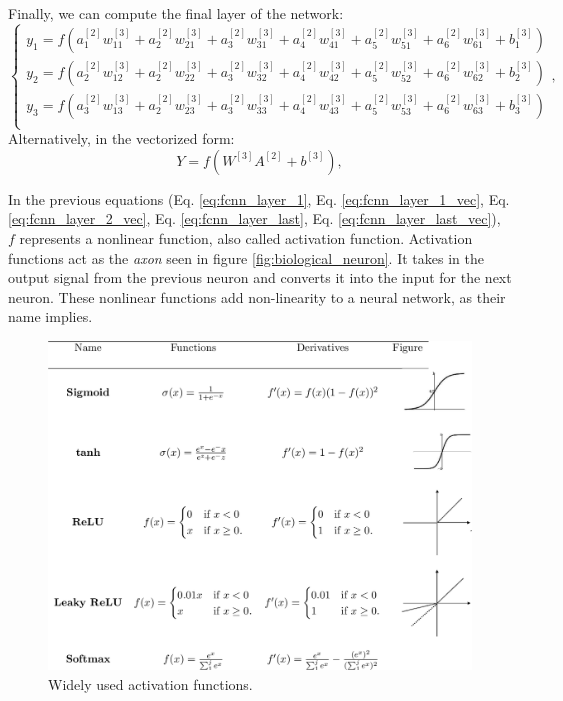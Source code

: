 Finally, we can compute the final layer of the network:
\begin{equation} \label{eq:fcnn_layer_last}
    \begin{cases}
        y_{1} = f(a^{[2]}_{1}w^{[3]}_{11} + a^{[2]}_{2}w^{[3]}_{21} + a^{[2]}_{3}w^{[3]}_{31} + a^{[2]}_{4}w^{[3]}_{41} + a^{[2]}_{5}w^{[3]}_{51} + a^{[2]}_{6}w^{[3]}_{61} + b^{[3]}_{1}) \\
        y_{2} = f(a^{[2]}_{2}w^{[3]}_{12} + a^{[2]}_{2}w^{[3]}_{22} + a^{[2]}_{3}w^{[3]}_{32} + a^{[2]}_{4}w^{[3]}_{42} + a^{[2]}_{5}w^{[3]}_{52} + a^{[2]}_{6}w^{[3]}_{62} + b^{[3]}_{2}) \\
        y_{3} = f(a^{[2]}_{3}w^{[3]}_{13} + a^{[2]}_{2}w^{[3]}_{23} + a^{[2]}_{3}w^{[3]}_{33} + a^{[2]}_{4}w^{[3]}_{43} + a^{[2]}_{5}w^{[3]}_{53} + a^{[2]}_{6}w^{[3]}_{63} + b^{[3]}_{3}) \\
    \end{cases}
    ,
\end{equation}
Alternatively, in the vectorized form:
\begin{equation} \label{eq:fcnn_layer_last_vec}
    Y = f(W^{[3]} A^{[2]} + b^{[3]}),
\end{equation}

In the previous equations (Eq. \ref{eq:fcnn_layer_1}, Eq.
\ref{eq:fcnn_layer_1_vec}, Eq. \ref{eq:fcnn_layer_2_vec}, Eq.
\ref{eq:fcnn_layer_last}, Eq. \ref{eq:fcnn_layer_last_vec}), $f$ represents a
nonlinear function, also called activation function. Activation functions act as
the \emph{axon} seen in figure \ref{fig:biological_neuron}. It takes in the
output signal from the previous neuron and converts it into the input for the
next neuron. These nonlinear functions add non-linearity to a neural network, as
their name implies.

\begin{figure}[htb]
    \includegraphics[clip,width=1\columnwidth]{Figures/related/activation_functions.png}
    \caption{ Widely used activation functions. }
    \label{fig:activation_functions}
\end{figure}

